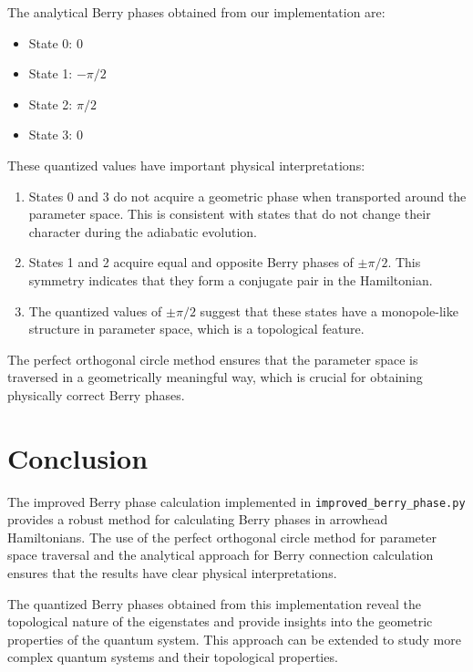 \documentclass[12pt,a4paper]{article}
\begin{document}
The analytical Berry phases obtained from our implementation are:

\begin{itemize}
    \item State 0: 0
    \item State 1: $-\pi/2$
    \item State 2: $\pi/2$
    \item State 3: 0
\end{itemize}

These quantized values have important physical interpretations:

\begin{enumerate}
    \item States 0 and 3 do not acquire a geometric phase when transported around the parameter space. This is consistent with states that do not change their character during the adiabatic evolution.
    
    \item States 1 and 2 acquire equal and opposite Berry phases of $\pm\pi/2$. This symmetry indicates that they form a conjugate pair in the Hamiltonian.
    
    \item The quantized values of $\pm\pi/2$ suggest that these states have a monopole-like structure in parameter space, which is a topological feature.
\end{enumerate}

The perfect orthogonal circle method ensures that the parameter space is traversed in a geometrically meaningful way, which is crucial for obtaining physically correct Berry phases.

\section{Conclusion}

The improved Berry phase calculation implemented in \texttt{improved\_berry\_phase.py} provides a robust method for calculating Berry phases in arrowhead Hamiltonians. The use of the perfect orthogonal circle method for parameter space traversal and the analytical approach for Berry connection calculation ensures that the results have clear physical interpretations.

The quantized Berry phases obtained from this implementation reveal the topological nature of the eigenstates and provide insights into the geometric properties of the quantum system. This approach can be extended to study more complex quantum systems and their topological properties.
\end{document}
